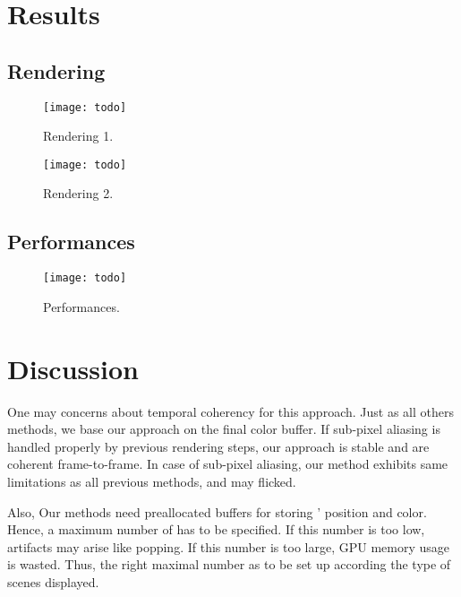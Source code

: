 \section{Results}

\subsection{Rendering}
	\begin{figure}[htb]\centering
	\texttt{[image: todo]}
	\caption{Rendering 1.}
	\label{YourName:fig1}
	\end{figure}

	\begin{figure}[htb]\centering
	\texttt{[image: todo]}
	\caption{Rendering 2.}
	\label{YourName:fig1}
	\end{figure}

\subsection{Performances}
	\begin{figure}[htb]\centering
	\texttt{[image: todo]}
	\caption{Performances.}
	\label{YourName:fig1}
	\end{figure}

\section{Discussion}
One may concerns about temporal coherency for this approach. Just as all others methods, we base our approach on the final color buffer. If sub-pixel aliasing is handled properly by previous rendering steps, our approach is stable and \bokehs are coherent frame-to-frame. In case of sub-pixel aliasing, our method exhibits same limitations as all previous methods, and \bokehs may flicked.

Also, Our methods need preallocated buffers for storing \bokehs' position and color. Hence, a maximum number of \bokehs has to be specified. If this number is too low, artifacts may arise like \bokeh popping. If this number is too large, GPU memory usage is wasted. Thus, the right maximal number as to be set up according the type of scenes displayed.

